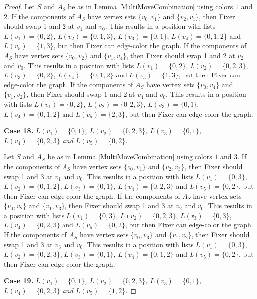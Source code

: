 \documentclass[12pt]{amsart}
\theoremstyle{plain}
\theoremstyle{definition}
\theoremstyle{remark}
\begin{document}
\begin{proof}
Let $S$ and $A_S$ be as in Lemma \ref{MultiMoveCombination} using colors $1$ and $2$. If the components of $A_S$ have vertex sets $\{v_0, v_1\}$ and $\{v_2, v_4\}$, then Fixer should swap 1 and 2 at $v_1$ and $v_0$. This results in a position with lists $L(v_1) = \{0, 2\}$, $L(v_2) = \{0, 1, 3\}$, $L(v_3) = \{0, 1\}$, $L(v_4) = \{0, 1, 2\}$ and $L(v_5) = \{1, 3\}$, but then Fixer can edge-color the graph.
If the components of $A_S$ have vertex sets $\{v_0, v_2\}$ and $\{v_1, v_4\}$, then Fixer should swap 1 and 2 at $v_2$ and $v_0$. This results in a position with lists $L(v_1) = \{0, 2\}$, $L(v_2) = \{0, 2, 3\}$, $L(v_3) = \{0, 2\}$, $L(v_4) = \{0, 1, 2\}$ and $L(v_5) = \{1, 3\}$, but then Fixer can edge-color the graph.
If the components of $A_S$ have vertex sets $\{v_0, v_4\}$ and $\{v_1, v_2\}$, then Fixer should swap 1 and 2 at $v_4$ and $v_0$. This results in a position with lists $L(v_1) = \{0, 2\}$, $L(v_2) = \{0, 2, 3\}$, $L(v_3) = \{0, 1\}$, $L(v_4) = \{0, 1, 2\}$ and $L(v_5) = \{2, 3\}$, but then Fixer can edge-color the graph.

\noindent\textbf{Case 18.  }\textit{$L(v_1) = \{0, 1\}$, $L(v_2) = \{0, 2, 3\}$, $L(v_3) = \{0, 1\}$, $L(v_4) = \{0, 2, 3\}$ and $L(v_5) = \{0, 2\}$.}

Let $S$ and $A_S$ be as in Lemma \ref{MultiMoveCombination} using colors $1$ and $3$. If the components of $A_S$ have vertex sets $\{v_0, v_1\}$ and $\{v_2, v_3\}$, then Fixer should swap 1 and 3 at $v_1$ and $v_0$. This results in a position with lists $L(v_1) = \{0, 3\}$, $L(v_2) = \{0, 1, 2\}$, $L(v_3) = \{0, 1\}$, $L(v_4) = \{0, 2, 3\}$ and $L(v_5) = \{0, 2\}$, but then Fixer can edge-color the graph.
If the components of $A_S$ have vertex sets $\{v_0, v_2\}$ and $\{v_1, v_3\}$, then Fixer should swap 1 and 3 at $v_2$ and $v_0$. This results in a position with lists $L(v_1) = \{0, 3\}$, $L(v_2) = \{0, 2, 3\}$, $L(v_3) = \{0, 3\}$, $L(v_4) = \{0, 2, 3\}$ and $L(v_5) = \{0, 2\}$, but then Fixer can edge-color the graph.
If the components of $A_S$ have vertex sets $\{v_0, v_3\}$ and $\{v_1, v_2\}$, then Fixer should swap 1 and 3 at $v_3$ and $v_0$. This results in a position with lists $L(v_1) = \{0, 3\}$, $L(v_2) = \{0, 2, 3\}$, $L(v_3) = \{0, 1\}$, $L(v_4) = \{0, 1, 2\}$ and $L(v_5) = \{0, 2\}$, but then Fixer can edge-color the graph.

\noindent\textbf{Case 19.  }\textit{$L(v_1) = \{0, 1\}$, $L(v_2) = \{0, 2, 3\}$, $L(v_3) = \{0, 1\}$, $L(v_4) = \{0, 2, 3\}$ and $L(v_5) = \{1, 2\}$.}


\end{proof}
\end{document}
